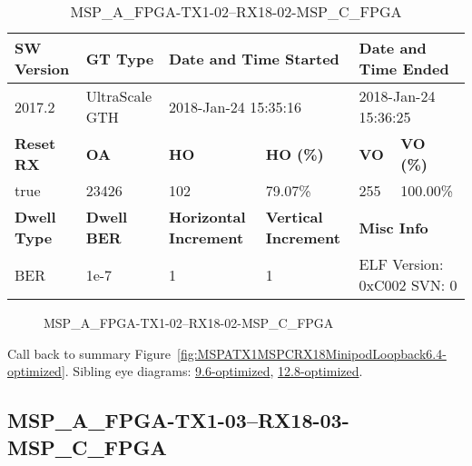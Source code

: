 \begin{table}[h]
\centering
\caption{MSP\_A\_FPGA-TX1-02--RX18-02-MSP\_C\_FPGA}
\label{tab:MSPAFPGATX102RX1802MSPCFPGA6.4-optimized}
\begin{tabular}{@{}|l|l|l|l|l|l|@{}}
\toprule
\textbf{SW Version}                & \textbf{GT Type}   & \multicolumn{2}{l|}{\textbf{Date and Time Started}}            & \multicolumn{2}{l|}{\textbf{Date and Time Ended}}        \\ \midrule
2017.2                       & UltraScale GTH          & \multicolumn{2}{l|}{2018-Jan-24 15:35:16}                   & \multicolumn{2}{l|}{2018-Jan-24 15:36:25}               \\ \midrule
\textbf{Reset RX}                  & \textbf{OA} & \textbf{HO}   & \textbf{HO (\%)} & \textbf{VO} & \textbf{VO (\%)} \\ \midrule
true & 23426        & 102          & 79.07\%        & 255        & 100.00\%       \\ \midrule
\textbf{Dwell Type}                & \textbf{Dwell BER} & \textbf{Horizontal Increment} & \textbf{Vertical Increment}    & \multicolumn{2}{l|}{\textbf{Misc Info}}                  \\ \midrule
BER                            & 1e-7        & 1        & 1           & \multicolumn{2}{l|}{ELF Version: 0xC002 SVN: 0}                         \\ \bottomrule
\end{tabular}
\end{table}

\begin{figure}[h]
\caption{MSP\_A\_FPGA-TX1-02--RX18-02-MSP\_C\_FPGA} \label{fig:MSPAFPGATX102RX1802MSPCFPGA6.4-optimized}
\end{figure}

Call back to summary Figure~\ref{fig:MSPATX1MSPCRX18MinipodLoopback6.4-optimized}.
Sibling eye diagrams: \hyperref[sec:MSPAFPGATX102RX1802MSPCFPGA9.6-optimized]{9.6-optimized}, \hyperref[sec:MSPAFPGATX102RX1802MSPCFPGA12.8-optimized]{12.8-optimized}.

\clearpage
\newpage


\subsection{MSP\_A\_FPGA-TX1-03--RX18-03-MSP\_C\_FPGA}\label{sec:MSPAFPGATX103RX1803MSPCFPGA6.4-optimized}

